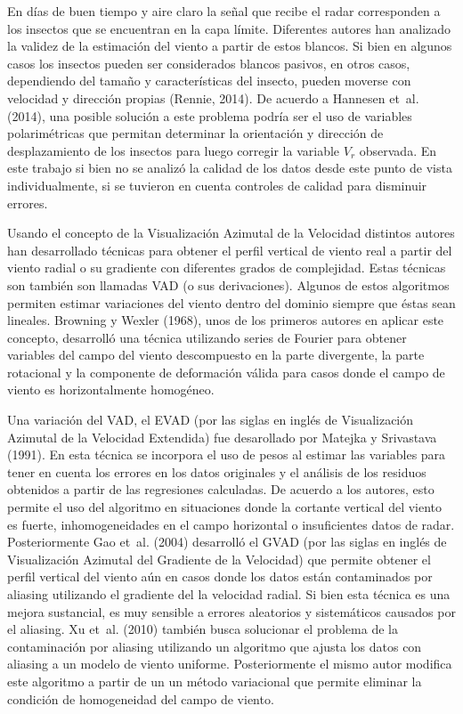 \documentclass[12pt,spanish,oneside]{book}
\begin{document}
En días de buen tiempo y aire claro la señal que recibe el radar
corresponden a los insectos que se encuentran en la capa límite.
Diferentes autores han analizado la validez de la estimación del viento
a partir de estos blancos. Si bien en algunos casos los insectos pueden
ser considerados blancos pasivos, en otros casos, dependiendo del tamaño
y características del insecto, pueden moverse con velocidad y dirección
propias (Rennie, 2014). De acuerdo a Hannesen et~al. (2014), una posible
solución a este problema podría ser el uso de variables polarimétricas
que permitan determinar la orientación y dirección de desplazamiento de
los insectos para luego corregir la variable \(V_r\) observada. En este
trabajo si bien no se analizó la calidad de los datos desde este punto
de vista individualmente, si se tuvieron en cuenta controles de calidad
para disminuir errores.

Usando el concepto de la Visualización Azimutal de la Velocidad
distintos autores han desarrollado técnicas para obtener el perfil
vertical de viento real a partir del viento radial o su gradiente con
diferentes grados de complejidad. Estas técnicas son también son
llamadas VAD (o sus derivaciones). Algunos de estos algoritmos permiten
estimar variaciones del viento dentro del dominio siempre que éstas sean
lineales. Browning y Wexler (1968), unos de los primeros autores en
aplicar este concepto, desarrolló una técnica utilizando series de
Fourier para obtener variables del campo del viento descompuesto en la
parte divergente, la parte rotacional y la componente de deformación
válida para casos donde el campo de viento es horizontalmente homogéneo.

Una variación del VAD, el EVAD (por las siglas en inglés de
Visualización Azimutal de la Velocidad Extendida) fue desarollado por
Matejka y Srivastava (1991). En esta técnica se incorpora el uso de
pesos al estimar las variables para tener en cuenta los errores en los
datos originales y el análisis de los residuos obtenidos a partir de las
regresiones calculadas. De acuerdo a los autores, esto permite el uso
del algoritmo en situaciones donde la cortante vertical del viento es
fuerte, inhomogeneidades en el campo horizontal o insuficientes datos de
radar. Posteriormente Gao et~al. (2004) desarrolló el GVAD (por las
siglas en inglés de Visualización Azimutal del Gradiente de la
Velocidad) que permite obtener el perfil vertical del viento aún en
casos donde los datos están contaminados por aliasing utilizando el
gradiente del la velocidad radial. Si bien esta técnica es una mejora
sustancial, es muy sensible a errores aleatorios y sistemáticos causados
por el aliasing. Xu et~al. (2010) también busca solucionar el problema
de la contaminación por aliasing utilizando un algoritmo que ajusta los
datos con aliasing a un modelo de viento uniforme. Posteriormente el
mismo autor modifica este algoritmo a partir de un un método variacional
que permite eliminar la condición de homogeneidad del campo de viento.
\end{document}
